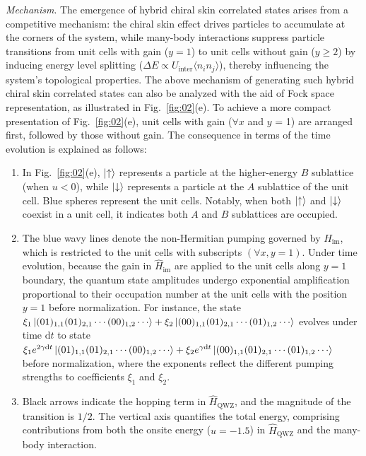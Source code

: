 \documentclass[longbibliography, aps, prx, amsmath, amssymb, amsfonts, twocolumn,superscriptaddress, footinbib]{revtex4-1}
\begin{document}
	\textit{Mechanism}. The emergence of hybrid chiral skin correlated states arises from a competitive mechanism: the chiral skin effect drives particles to accumulate at the corners of the system, while many-body interactions suppress particle transitions from unit cells with gain ($y=1$) to unit cells without gain ($y \geq 2$) by inducing energy level splitting ($\Delta E \propto U_{\text{inter}}\langle n_i n_j \rangle$), thereby influencing the system's topological properties.
	The above mechanism of generating such hybrid chiral skin correlated states can also be analyzed with the aid of Fock space representation, as illustrated in Fig.~\ref{fig:02}(e). 
	To achieve a more compact presentation of Fig.~\ref{fig:02}(e), unit cells with gain ($\forall x$ and $y$ = 1) are arranged first, followed by those without gain. The consequence in terms of the time evolution is explained as follows:
	\begin{enumerate}
		\item In Fig.~\ref{fig:02}(e), $\ket{\uparrow}$ represents a particle at the higher-energy $B$ sublattice (when $u<0$), while $\ket{\downarrow}$ represents a particle at the $A$ sublattice of the unit cell. 
		Blue spheres represent the unit cells.
		Notably, when both $\ket{\uparrow}$ and $\ket{\downarrow}$ coexist in a unit cell, it indicates both $A$ and $B$ sublattices are occupied.
		\item The blue wavy lines denote the non-Hermitian pumping governed by $\hat{H}_{\text{im}}$, which is restricted to the unit cells with subscripts $(\forall x,y=1)$. Under time evolution, because the gain in $\hat{H}_{\text{im}}$ are applied to the unit cells along $y=1$ boundary, the quantum state amplitudes undergo exponential amplification proportional to their occupation number at the unit cells with the position $y=1$ before normalization. For instance, the state $\xi_1 \ket{(01)_{1,1}(01)_{2,1}\cdots(00)_{1,2}\cdots} + \xi_2\ket{(00)_{1,1}(01)_{2,1}\cdots(01)_{1,2}\cdots}$ evolves under time $\mathrm{d}t$ to state $\xi_1 e^{2\gamma \mathrm{d}t} \ket{(01)_{1,1}(01)_{2,1}\cdots(00)_{1,2}\cdots} + \xi_2 e^{\gamma \mathrm{d}t} \ket{(00)_{1,1}(01)_{2,1}\cdots(01)_{1,2}\cdots}$ before normalization, where the exponents reflect the different pumping strengths to coefficients $\xi_1$ and $\xi_2$. 
		\item Black arrows indicate the hopping term in $\hat{H}_{\text{QWZ}}$, and the magnitude of the transition is $1/2$. The vertical axis quantifies the total energy, comprising contributions from both the onsite energy ($u=-1.5$) in $\hat{H}_{\text{QWZ}}$ and the many-body interaction.
	\end{enumerate}
\end{document}
